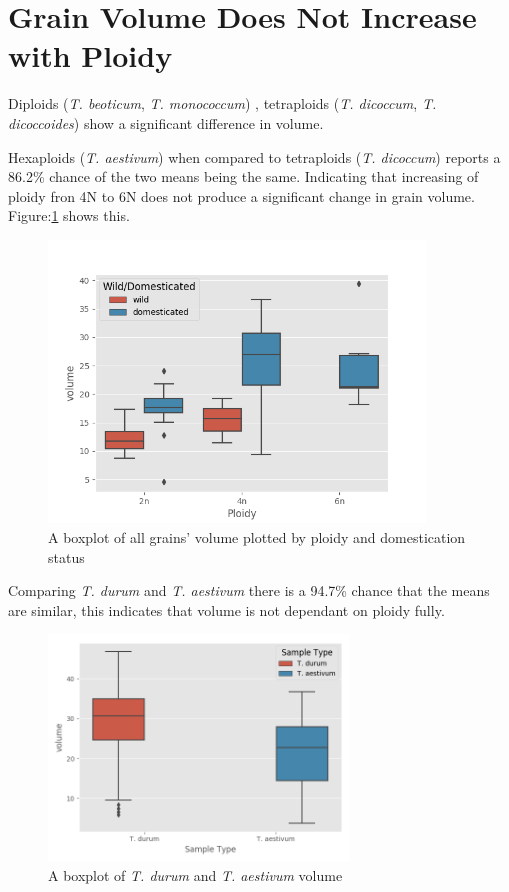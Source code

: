 \documentclass[11pt]{report}
\begin{document}
\clearpage


\section{Grain Volume Does Not Increase with Ploidy}
\label{sec:org187f120}

Diploids (\emph{T. beoticum}, \emph{T. monococcum}) , tetraploids (\emph{T. dicoccum}, \emph{T. dicoccoides})  show a significant difference in volume.

Hexaploids (\emph{T. aestivum}) when compared to tetraploids (\emph{T. dicoccum}) reports a 86.2\% chance of the two means being the same. Indicating that increasing of ploidy fron 4N to 6N does not produce a significant change in grain volume. Figure:\ref{fig:orgfe9ad17} shows this.

\begin{figure}[htbp]
\centering
\includegraphics[width=10cm]{./images/results/ploidyvol.png}
\caption{\label{fig:orgfe9ad17}
A boxplot of all grains' volume plotted by ploidy and domestication status}
\end{figure}


Comparing \emph{T. durum} and \emph{T. aestivum} there is a 94.7\% chance that the means are similar, this indicates that volume is not dependant on ploidy fully.


\begin{figure}[htbp]
\centering
\includegraphics[width=8cm]{./images/results/group7/volume.png}
\caption{\label{fig:org7054120}
A boxplot of \emph{T. durum} and \emph{T. aestivum} volume}
\end{figure}
\end{document}
